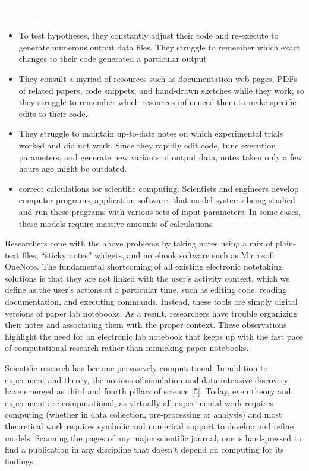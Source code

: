 -----------------------------------------------------------------------------------------------------------------------
\begin{itemize}

\item To test hypotheses, they constantly adjust their
code and re-execute to generate numerous output
data files. They struggle to remember which exact
changes to their code generated a particular output

\item They consult a myriad of resources such as documentation
web pages, PDFs of related papers, code
snippets, and hand-drawn sketches while they work,
so they struggle to remember which resources influenced
them to make specific edits to their code.

\item They struggle to maintain up-to-date notes on which
experimental trials worked and did not work. Since
they rapidly edit code, tune execution parameters,
and generate new variants of output data, notes
taken only a few hours ago might be outdated.

\item correct calculations for scientific computing.
Scientists and engineers develop computer programs, application software, that model systems being studied and run these programs with various sets of input parameters. In some cases, these models require massive amounts of calculations
\end{itemize}


Researchers cope with the above problems by taking
notes using a mix of plain-text files, “sticky notes” widgets,
and notebook software such as Microsoft OneNote.
The fundamental shortcoming of all existing electronic
notetaking solutions is that they are not linked with the
user’s activity context, which we define as the user’s actions
at a particular time, such as editing code, reading
documentation, and executing commands. Instead,
these tools are simply digital versions of paper lab notebooks.
As a result, researchers have trouble organizing
their notes and associating them with the proper context.
These observations highlight the need for an electronic
lab notebook that keeps up with the fast pace of computational
research rather than mimicking paper notebooks.

Scientific research has become pervasively computational. In addition to experiment and theory, the notions of simulation and data-intensive discovery have emerged as third and fourth pillars of science [5]. Today, even theory and experiment are computational, as virtually all experimental work requires computing (whether in data collection, pre-processing or analysis) and most theoretical work requires symbolic and numerical support to develop and refine models. Scanning the pages of any major scientific journal, one is hard-pressed to find a publication in any discipline that doesn't depend on computing for its findings.

